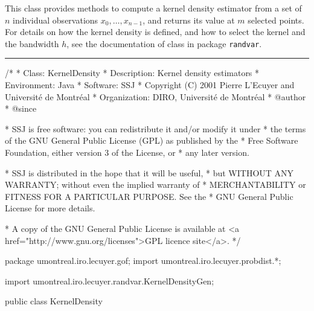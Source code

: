 
This class provides methods to compute a kernel density estimator from a set
of $n$ individual observations $x_0, \ldots, x_{n-1}$, and returns its value
at $m$ selected points. For details on how the kernel density is defined,
and how to select the kernel and the bandwidth $h$,
see the documentation of class 
in package \texttt{randvar}.

\bigskip\hrule

\begin{code}
\begin{hide}
/*
 * Class:        KernelDensity
 * Description:  Kernel density estimators
 * Environment:  Java
 * Software:     SSJ 
 * Copyright (C) 2001  Pierre L'Ecuyer and Université de Montréal
 * Organization: DIRO, Université de Montréal
 * @author       
 * @since

 * SSJ is free software: you can redistribute it and/or modify it under
 * the terms of the GNU General Public License (GPL) as published by the
 * Free Software Foundation, either version 3 of the License, or
 * any later version.

 * SSJ is distributed in the hope that it will be useful,
 * but WITHOUT ANY WARRANTY; without even the implied warranty of
 * MERCHANTABILITY or FITNESS FOR A PARTICULAR PURPOSE.  See the
 * GNU General Public License for more details.

 * A copy of the GNU General Public License is available at
   <a href="http://www.gnu.org/licenses">GPL licence site</a>.
 */
\end{hide}
package umontreal.iro.lecuyer.gof;
   import umontreal.iro.lecuyer.probdist.*;
\begin{hide}
import umontreal.iro.lecuyer.randvar.KernelDensityGen;
\end{hide}

public class KernelDensity \begin{hide} {

   private static double estimate (EmpiricalDist dist,
                                   ContinuousDistribution kern,
                                   double h, double y) {
      // Computes and returns the kernel density estimate at $y$, where the 
      // kernel is the density kern.density(x), and the bandwidth is $h$.
      double z;
      double a = kern.getXinf();       // lower limit of density
      double b = kern.getXsup();       // upper limit of density
      double sum = 0;
      int n = dist.getN();
      for (int i = 0; i < n; i++) {
         z = (y - dist.getObs(i))/h;
         if ((z >= a) && (z <= b))
            sum += kern.density(z);
      }

      sum /= (h*n);
      return sum;
   }\end{hide}
\end{code}


